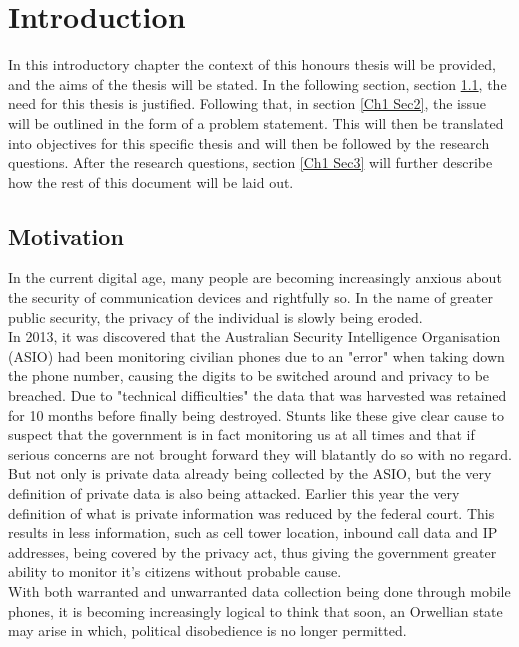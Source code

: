 
\chapter{Introduction} %

\label{Chapter 1} %

In this introductory chapter the context of this honours thesis will be provided, and the aims of the thesis will be stated.
In the following section, section \ref{Ch1 Sec1}, the need for this thesis is justified.
Following that, in section \ref{Ch1 Sec2}, the issue will be outlined in the form of a problem statement.
This will then be translated into objectives for this specific thesis and will then be followed by the research questions.
After the research questions, section \ref{Ch1 Sec3} will further describe how the rest of this document will be laid out.   


\section{Motivation}

\label{Ch1 Sec1}

In the current digital age, many people are becoming increasingly anxious about the security of communication devices and rightfully so. In the name of greater public security, the privacy of the individual is slowly being eroded.\\
In 2013, it was discovered that the Australian Security Intelligence Organisation (ASIO) had been monitoring civilian phones due to an "error" when taking down the phone number, causing the digits to be switched around and privacy to be breached. Due to "technical difficulties" the data that was harvested was retained for 10 months before finally being destroyed.\cite{Reference36} Stunts like these give clear cause to suspect that the government is in fact monitoring us at all times and that if serious concerns are not brought forward they will blatantly do so with no regard.\\
But not only is private data already being collected by the ASIO, but the very definition of private data is also being attacked. Earlier this year the very definition of what is private information was reduced by the federal court. This results in less information, such as cell tower location, inbound call data and IP addresses, being covered by the privacy act, thus giving the government greater ability to monitor it's citizens without probable cause.\cite{Reference37}\\
With both warranted and unwarranted data collection being done through mobile phones, it is becoming increasingly logical to think that soon, an Orwellian state may arise in which, political disobedience is no longer permitted.

